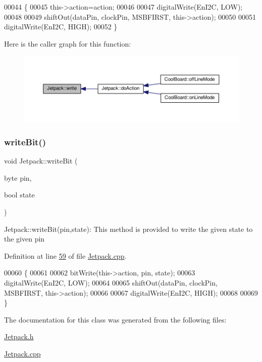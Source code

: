 \begin{DoxyCode}
00044 \{
00045     this->action=action;
00046 
00047     digitalWrite(EnI2C, LOW);
00048     
00049     shiftOut(dataPin, clockPin, MSBFIRST, this->action);
00050 
00051     digitalWrite(EnI2C, HIGH);
00052 \}   
\end{DoxyCode}
Here is the caller graph for this function\+:
\nopagebreak
\begin{figure}[H]
\begin{center}
\leavevmode
\includegraphics[width=350pt]{class_jetpack_a338f1af8cbc6504ac69b47c7328569b5_icgraph}
\end{center}
\end{figure}
\mbox{\label{class_jetpack_a79ae7bc3c1828a0551a7c005c4f8bd00}} 
\subsubsection{\texorpdfstring{write\+Bit()}{writeBit()}}
{\footnotesize\ttfamily void Jetpack\+::write\+Bit (\begin{DoxyParamCaption}\item[{byte}]{pin,  }\item[{bool}]{state }\end{DoxyParamCaption})}

Jetpack\+::write\+Bit(pin,state)\+: This method is provided to write the given state to the given pin 

Definition at line \hyperlink{_jetpack_8cpp_source_l00059}{59} of file \hyperlink{_jetpack_8cpp_source}{Jetpack.\+cpp}.


\begin{DoxyCode}
00060 \{
00061 
00062     bitWrite(this->action, pin, state);
00063     digitalWrite(EnI2C, LOW);
00064     
00065     shiftOut(dataPin, clockPin, MSBFIRST, this->action);
00066 
00067     digitalWrite(EnI2C, HIGH);
00068 
00069 \}
\end{DoxyCode}


The documentation for this class was generated from the following files\+:\begin{DoxyCompactItemize}
\item 
\hyperlink{_jetpack_8h}{Jetpack.\+h}\item 
\hyperlink{_jetpack_8cpp}{Jetpack.\+cpp}\end{DoxyCompactItemize}
